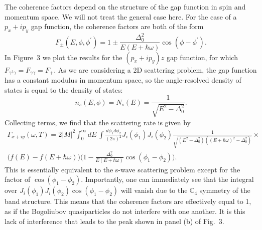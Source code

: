 	The coherence factors depend on the structure of the gap function in spin and momentum space. We will not treat the general case here.  
	For the case of a $p_x+ip_y$ gap function, the coherence factors are both of the form
	\begin{equation}
	F_\pm(E,\phi,\phi^\prime)=1\pm\frac{\Delta_0^2}{E(E+\hbar\omega)}\cos(\phi-\phi^\prime).
	\end{equation}
	In Figure~3 we plot the results for the $(p_x+ip_y)\hat{z}$ gap function, for which $F_{\gamma^\dagger\gamma}=F_{\gamma\gamma}=F_+$.
	As we are considering a 2D scattering problem, the gap function has a constant modulus in momentum space, so the angle-resolved density of states is equal to the density of states:
	\begin{equation}
	n_s(E,\phi)=N_s(E)=\frac{1}{\sqrt{E^2-\Delta_0^2}}.
	\end{equation}
	Collecting terms, we find that the scattering rate is given by
	\begin{multline}
	\Gamma_{x+iy}(\omega,T)=2|M|^2\int_0^\infty dE~\int\frac{d\phi_1d\phi_2}{(2\pi)^2}J_i(\phi_1)J_i(\phi_2)\frac{1}{\sqrt{(E^2-\Delta_0^2)((E+\hbar\omega)^2-\Delta_0^2)}}\times\\\big(f(E)-f(E+\hbar\omega)\big)\bigg(1-\frac{\Delta_0^2}{E(E+\hbar\omega)}\cos(\phi_1-\phi_2)\bigg).
	\end{multline}
	This is essentially equivalent to the s-wave scattering problem except for the factor of $\cos(\phi_1-\phi_2)$. Importantly, one can immediately see that the integral over $J_i(\phi_1)J_i(\phi_2)\cos(\phi_1-\phi_2)$ will vanish due to the $\mathbb{C}_4$ symmetry of the band structure. This means that the coherence factors are effectively equal to 1, as if the Bogoliubov quasiparticles do not interfere with one another. It is this lack of interference that leads to the peak shown in panel (b) of Fig.~3. 
	
